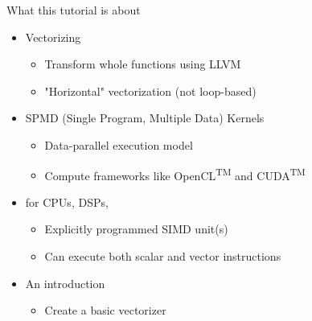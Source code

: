 \documentclass[t,aspectratio=169]{beamer}
\begin{document}
\begin{frame}{What this tutorial is about}

\begin{minipage}[t]{0.70\linewidth}

\begin{itemize}  
    \item Vectorizing
    \begin{itemize}
        \item Transform whole functions using LLVM
        \item "Horizontal" vectorization (not loop-based)
    \end{itemize}  
    \item SPMD (Single Program, Multiple Data) Kernels
    \begin{itemize}
        \item Data-parallel execution model
        \item Compute frameworks like OpenCL\textsuperscript{TM} and CUDA\textsuperscript{TM}
    \end{itemize}
    \item for CPUs, DSPs,
    \begin{itemize}
        \item Explicitly programmed SIMD unit(s)
        \item Can execute both scalar and vector instructions
    \end{itemize}
    \item An introduction
    \begin{itemize}
        \item Create a basic vectorizer
    \end{itemize}
\end{itemize}


\end{minipage}
\end{frame}
\end{document}
